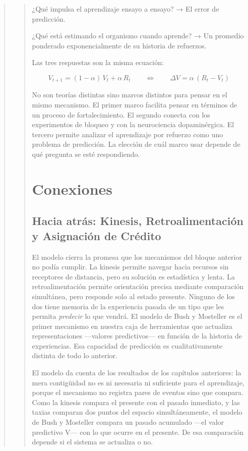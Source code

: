 \documentclass[
  letterpaper,
  DIV=11,
  numbers=noendperiod]{scrreprt}
\begin{document}
\begin{tcolorbox}[enhanced jigsaw, arc=.35mm, bottomrule=.15mm, breakable, colback=white, colframe=quarto-callout-note-color-frame, left=2mm, leftrule=.75mm, opacityback=0, rightrule=.15mm, toprule=.15mm]
\begin{quote}
\begin{quote}
¿Qué impulsa el aprendizaje ensayo a ensayo? → El error de predicción.

¿Qué está estimando el organismo cuando aprende? → Un promedio ponderado
exponencialmente de su historia de refuerzos.

Las tres respuestas son la misma ecuación:

\[V_{t+1} = (1-\alpha)\,V_t + \alpha\,R_t \qquad \Longleftrightarrow \qquad \Delta V = \alpha\,(R_t - V_t)\]

No son teorías distintas sino marcos distintos para pensar en el mismo
mecanismo. El primer marco facilita pensar en términos de un proceso de
fortalecimiento. El segundo conecta con los experimentos de bloqueo y
con la neurociencia dopaminérgica. El tercero permite analizar el
aprendizaje por refuerzo como uno problema de predicción. La elección de
cuál marco usar depende de qué pregunta se esté respondiendo.

\mbox{}%
\section{Conexiones}\label{conexiones-3}

\mbox{}%
\subsection{Hacia atrás: Kinesis, Retroalimentación y Asignación de
Crédito}\label{hacia-atruxe1s-kinesis-retroalimentaciuxf3n-y-asignaciuxf3n-de-cruxe9dito}

El modelo cierra la promesa que los mecanismos del bloque anterior no
podía cumplir. La kinesis permite navegar hacia recursos sin receptores
de distancia, pero su solución es estadística y lenta. La
retroalimentación permite orientación precisa mediante comparación
simultánea, pero responde solo al estado presente. Ninguno de los dos
tiene memoria de la experiencia pasada de un tipo que les permita
\emph{predecir} lo que vendrá. El modelo de Bush y Mosteller es el
primer mecanismo en nuestra caja de herramientas que actualiza
representaciones ---valores predictivos--- en función de la historia de
experiencias. Esa capacidad de predicción es cualitativamente distinta
de todo lo anterior.

El modelo da cuenta de los resultados de los capítulos anteriores: la
mera contigüidad no es ni necesaria ni suficiente para el aprendizaje,
porque el mecanismo no registra pares de eventos sino que compara. Como
la kinesis compara el presente con el pasado inmediato, y las taxias
comparan dos puntos del espacio simultáneamente, el modelo de Bush y
Mosteller compara un pasado acumulado ---el valor predictivo V--- con lo
que ocurre en el presente. De esa comparación depende si el sistema se
actualiza o no.


\end{quote}
\end{quote}
\end{tcolorbox}
\end{document}
